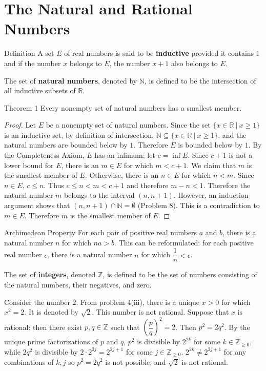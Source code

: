 \section{The Natural and Rational Numbers}
\begin{flushleft}

\begin{namedthm*}{Definition}
	A set $E$ of real numbers is said to be \textbf{inductive} provided it contains 1 and if the number $x$ belongs to $E$, the number $x+1$ also belongs to $E$.
\end{namedthm*}

The set of \textbf{natural numbers}, denoted by $\mathbb{N}$, is defined to be the intersection of all inductive subsets of $\mathbb{R}$. 

\begin{namedthm*}{Theorem 1}
	Every nonempty set of natural numbers has a smallest member.
\end{namedthm*}
\begin{proof}
	Let $E$ be a nonempty set of natural numbers. Since the set $\{x\in \mathbb{R}\ |\ x \ge 1 \}$ is an inductive set, by definition of intersection, $\mathbb{N} \subseteq \{x\in \mathbb{R}\ |\ x \ge 1 \}$, and the natural numbers are bounded below by $1$.
	Therefore $E$ is bounded below by $1$. By the Completeness Axiom, $E$ has an infimum; let $c=\inf E$.
	Since $c+1$ is not a lower bound for $E$, there is an $m \in E$ for which $m < c+1$.
	We claim that $m$ is the smallest member of $E$. Otherwise, there is an $n\in E$ for which $n<m$. Since $n \in E$, $c\le n$. Thus $c \le n < m < c+1$ and therefore $m-n<1$.
	Therefore the natural number $m$ belongs to the interval $(n,n+1)$. However, an induction argument shows that $(n, n+1) \cap \mathbb{N} = \emptyset$ (Problem 8). 
	This is a contradiction to $m \in E$. Therefore $m$ is the smallest member of $E$.
\end{proof}

\begin{namedthm*}{Archimedean Property}
	For each pair of positive real numbers $a$ and $b$, there is a natural number $n$ for which $na>b$. This can be reformulated: for each positive real number $\epsilon$, there is a natural number $n$ for which $\dfrac{1}{n} < \epsilon$.
\end{namedthm*}

The set of \textbf{integers}, denoted $\mathbb{Z}$, is defined to be the set of numbers consisting of the natural numbers, their negatives, and zero.
\par
\medskip
Consider the number $2$. From problem 4(iii), there is a unique $x>0$ for which $x^2=2$. It is denoted by $\sqrt{2}$. This number is not rational.
Suppose that $x$ is rational: then there exist $p,q \in \mathbb{Z}$ such that $(\dfrac{p}{q})^2=2$. Then $p^2=2q^2$. 
By the unique prime factorizations of $p$ and $q$, $p^2$ is divisible by $2^{2k}$ for some $k \in \mathbb{Z}_{\ge 0}$, while $2q^2$ is divisible by $2 \cdot 2^{2j} = 2^{2j+1}$ for some $j \in \mathbb{Z}_{\ge 0}$.
$2^{2k} \neq 2^{2j+1}$ for any combinations of $k,j$ so $p^2=2q^2$ is not possible, and $\sqrt{2}$ is not rational.


\end{flushleft}
